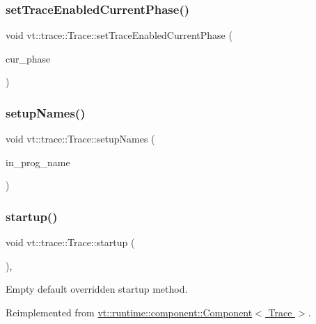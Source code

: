 \subsubsection{\texorpdfstring{set\+Trace\+Enabled\+Current\+Phase()}{setTraceEnabledCurrentPhase()}}
{\footnotesize\ttfamily void vt\+::trace\+::\+Trace\+::set\+Trace\+Enabled\+Current\+Phase (\begin{DoxyParamCaption}\item[{\hyperlink{namespacevt_a46ce6733d5cdbd735d561b7b4029f6d7}{Phase\+Type}}]{cur\+\_\+phase }\end{DoxyParamCaption})}

\mbox{\label{structvt_1_1trace_1_1_trace_a52cc4e12a7159cf21d8893b961834af8}} 
\subsubsection{\texorpdfstring{setup\+Names()}{setupNames()}}
{\footnotesize\ttfamily void vt\+::trace\+::\+Trace\+::setup\+Names (\begin{DoxyParamCaption}\item[{std\+::string const \&}]{in\+\_\+prog\+\_\+name }\end{DoxyParamCaption})}

\mbox{\label{structvt_1_1trace_1_1_trace_a5dd8767d9020ebeaba49ea3a684738a1}} 
\subsubsection{\texorpdfstring{startup()}{startup()}}
{\footnotesize\ttfamily void vt\+::trace\+::\+Trace\+::startup (\begin{DoxyParamCaption}{ }\end{DoxyParamCaption})\hspace{0.3cm}{\ttfamily [override]}, {\ttfamily [virtual]}}



Empty default overridden startup method. 



Reimplemented from \hyperlink{structvt_1_1runtime_1_1component_1_1_component_aad3974307ab3b2e1df389a91310f68c2}{vt\+::runtime\+::component\+::\+Component$<$ Trace $>$}.

